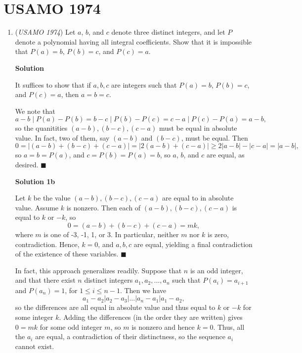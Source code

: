\section{USAMO 1974}
        \begin{enumerate}
        	\item (\textit{USAMO 1974}) Let $a$, $b$, and $c$ denote three distinct integers, and let $P$ denote a polynomial having all integral coefficients.  Show that it is impossible that $P(a)=b$, $P(b)=c$, and $P(c)=a$.


 



\textbf{Solution}

It suffices to show that if $a,b,c$ are integers such that $P(a) = b$, $P(b)=c$, and $P(c)= a$, then $a=b=c$.

 We note that
 \[a-b \mid P(a) - P(b) = b-c \mid P(b)-P(c) = c-a \mid P(c) - P(a) = a-b ,\]so the quanitities $(a-b), (b-c), (c-a)$ must be equal in absolute value.  In fact, two of them, say $(a-b)$ and $(b-c)$, must be equal.  Then
 \[0 = \lvert (a-b) + (b-c) + (c-a) \rvert = \lvert 2(a-b) + (c-a) \rvert \ge 2 \lvert a-b \rvert - \lvert c-a \rvert = \lvert a-b \rvert ,\]so $a=b= P(a)$, and $c= P(b) = P(a) = b$, so $a$, $b$, and $c$ are equal, as desired.  $\blacksquare$




\textbf{Solution 1b}

Let $k$ be the value $(a-b), (b-c), (c-a)$ are equal to in absolute value. Assume $k$ is nonzero. Then each of $(a-b), (b-c), (c-a)$ is equal to $k$ or $-k$, so 
 \[0 = (a-b) + (b-c) + (c-a) = mk,\] where $m$ is one of -3, -1, 1, or 3. In particular, neither $m$ nor $k$ is zero, contradiction. Hence, $k = 0$, and $a, b, c$ are equal, yielding a final contradiction of the existence of these variables. $\blacksquare$

 In fact, this approach generalizes readily. Suppose that $n$ is an odd integer, and that there exist $n$ distinct integers $a_1, a_2, ..., a_n$ such that $P(a_i) = a_{i+1}$ and $P(a_n) = 1$, for $1 \le i \le n-1$. Then we have 
 \[a_1 - a_2 | a_2 - a_3 | ... | a_n - a_1 | a_1 - a_2,\] so the differences are all equal in absolute value and thus equal to $k$ or $-k$ for some integer $k$. Adding the differences (in the order they are written) gives $0 = mk$ for some odd integer $m$, so $m$ is nonzero and hence $k = 0$. Thus, all the $a_i$ are equal, a contradiction of their distinctness, so the sequence $a_i$ cannot exist.


\end{enumerate}
